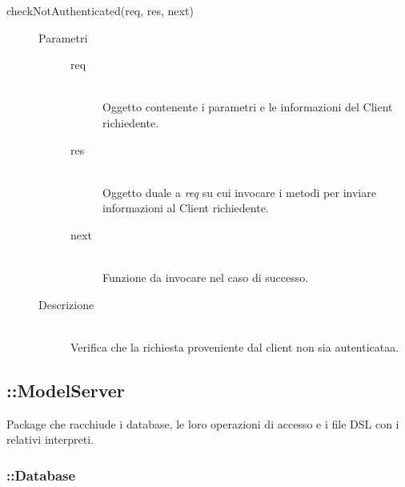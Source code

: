 \begin{description}
\begin{description}
     \item[checkNotAuthenticated(req, res, next)] \hfill 
     \begin{description}
      \item[Parametri] \hfill
      \begin{description}
       \item[req] \hfill \\
	    Oggetto contenente i parametri e le informazioni del Client richiedente.
	   \item[res] \hfill \\
	    Oggetto duale a \textit{req} su cui invocare i metodi per inviare informazioni al Client richiedente.
       \item[next] \hfill \\
        Funzione da invocare nel caso di successo.
      \end{description}
      \item[Descrizione] \hfill \\
      Verifica che la richiesta proveniente dal client non sia autenticataa.
     \end{description}
  \end{description}
\end{description}

\subsection{::ModelServer}
Package che racchiude i database, le loro operazioni di accesso e i file DSL con i relativi interpreti.

\subsubsection{::Database}
